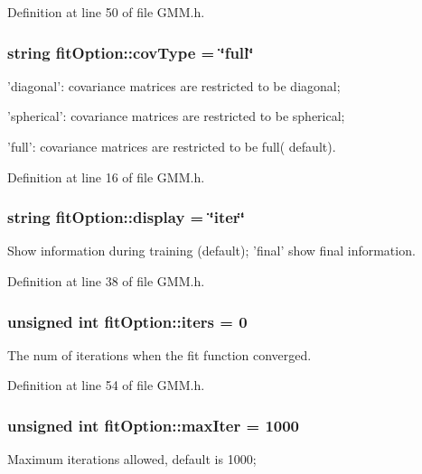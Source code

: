 Definition at line 50 of file G\+M\+M.\+h.

\hypertarget{structfit_option_ae1d880f6fcd26e15f07d50c77c5cceea}{
\subsubsection[{cov\+Type}]{\setlength{\rightskip}{0pt plus 5cm}string fit\+Option\+::cov\+Type = \char`\"{}full\char`\"{}}}\label{structfit_option_ae1d880f6fcd26e15f07d50c77c5cceea}
'diagonal'\+: covariance matrices are restricted to be diagonal;

'spherical'\+: covariance matrices are restricted to be spherical;

'full'\+: covariance matrices are restricted to be full( default). 

Definition at line 16 of file G\+M\+M.\+h.

\hypertarget{structfit_option_acd949efbbb51ddf447d4cb86fd2ac901}{
\subsubsection[{display}]{\setlength{\rightskip}{0pt plus 5cm}string fit\+Option\+::display = \char`\"{}iter\char`\"{}}}\label{structfit_option_acd949efbbb51ddf447d4cb86fd2ac901}
Show information during training (default); 'final' show final information. 

Definition at line 38 of file G\+M\+M.\+h.

\hypertarget{structfit_option_a711048d488fccee5740b31e4149c46de}{
\subsubsection[{iters}]{\setlength{\rightskip}{0pt plus 5cm}unsigned int fit\+Option\+::iters = 0}}\label{structfit_option_a711048d488fccee5740b31e4149c46de}
The num of iterations when the fit function converged. 

Definition at line 54 of file G\+M\+M.\+h.

\hypertarget{structfit_option_a54d1906ece53c348047c8b404ff06053}{
\subsubsection[{max\+Iter}]{\setlength{\rightskip}{0pt plus 5cm}unsigned int fit\+Option\+::max\+Iter = 1000}}\label{structfit_option_a54d1906ece53c348047c8b404ff06053}
Maximum iterations allowed, default is 1000; 

